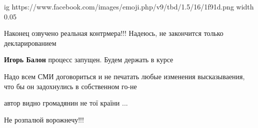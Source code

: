 \begin{itemize}
\begin{itemize}
\ifcmt
  ig https://www.facebook.com/images/emoji.php/v9/tbd/1.5/16/1f91d.png
  width 0.05
\fi

\end{itemize}

 
Наконец озвучено реальная контрмера!!! Надеюсь, не закончится только декларированием

\begin{itemize}
 
\textbf{Игорь Балон} процесс запущен. Будем держать в курсе
\end{itemize}

 
Надо всем СМИ договориться и не печатать любые изменения высказываения, что бы он задохнулись в собственном го-не

 
автор видно громадянин не тої країни ...

 
Не розпалюй ворожнечу!!!

\begin{itemize}
 

\end{itemize}
\end{itemize}
